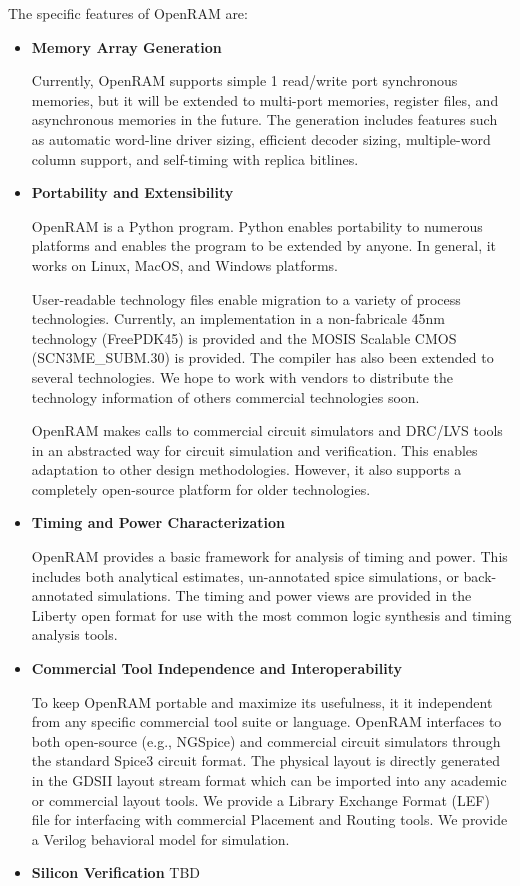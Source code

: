 The specific features of OpenRAM are:
\begin{itemize}

\item \textbf{Memory Array Generation} 

  Currently, OpenRAM supports simple 1 read/write port synchronous
  memories, but it will be extended to multi-port memories, register
  files, and asynchronous memories in the future. The generation
  includes features such as automatic word-line driver sizing,
  efficient decoder sizing, multiple-word column support, and
  self-timing with replica bitlines.

\item \textbf{Portability and Extensibility} 

  OpenRAM is a Python program. Python enables portability to numerous
  platforms and enables the program to be extended by anyone. In
  general, it works on Linux, MacOS, and Windows platforms.

  User-readable technology files enable migration to a variety of
  process technologies. Currently, an implementation in a
  non-fabricale 45nm technology (FreePDK45) is provided and the MOSIS
  Scalable CMOS (SCN3ME\_SUBM.30) is provided. The compiler has also
  been extended to several technologies. We hope to work with vendors
  to distribute the technology information of others commercial
  technologies soon.

  OpenRAM makes calls to commercial circuit simulators and DRC/LVS
  tools in an abstracted way for circuit simulation and
  verification. This enables adaptation to other design
  methodologies. However, it also supports a completely open-source
  platform for older technologies.

\item \textbf{Timing and Power Characterization}

  OpenRAM provides a basic framework for analysis of timing and power.
  This includes both analytical estimates, un-annotated spice
  simulations, or back-annotated simulations.  The timing and power
  views are provided in the Liberty open format for use with the most
  common logic synthesis and timing analysis tools.

\item \textbf{Commercial Tool Independence and Interoperability}

  To keep OpenRAM portable and maximize its usefulness, it it
  independent from any specific commercial tool suite or
  language. OpenRAM interfaces to both open-source (e.g., NGSpice) and
  commercial circuit simulators through the standard Spice3 circuit
  format. The physical layout is directly generated in the GDSII
  layout stream format which can be imported into any academic or
  commercial layout tools. We provide a Library Exchange Format (LEF)
  file for interfacing with commercial Placement and Routing tools.
  We provide a Verilog behavioral model for simulation.

\item \textbf{Silicon Verification} 
  TBD

\end{itemize}


